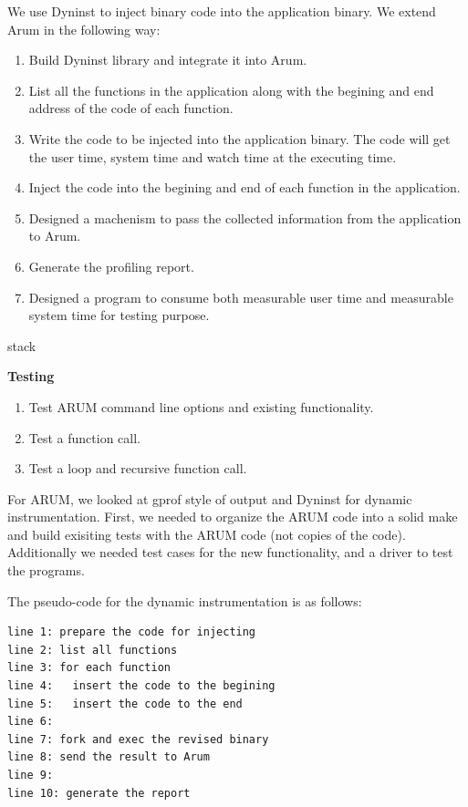 \documentclass[11pt,letterpaper,oneside]{article}
\begin{document}
We use Dyninst to inject binary code into the application binary. We extend Arum in the following way:
\begin{enumerate}
\item Build Dyninst library and integrate it into Arum.
\item List all the functions in the application along with the begining and end address of the code of each function.
\item Write the code to be injected into the application binary. The code will get the user time, system time and watch time at the executing time.
\item Inject the code into the begining and end of each function in the application.
\item Designed a machenism to pass the collected information from the application to Arum.
\item Generate the profiling report.
\item Designed a program to consume both measurable user time and measurable system time for testing purpose.
\end{enumerate}

stack

\textbf{Testing}
\begin{enumerate}
\item Test ARUM command line options and existing functionality.
\item Test a function call.
\item Test a loop and recursive function call.
\end{enumerate}

For ARUM, we looked at gprof style of output and Dyninst for dynamic instrumentation.  First, we needed to organize the ARUM code into a solid make and build exisiting tests with the ARUM code (not copies of the code).   Additionally we needed test cases for the new functionality, and a driver to test the programs.

The pseudo-code for the dynamic instrumentation is as follows:
\begin{Verbatim}[frame=single]
line 1: prepare the code for injecting
line 2: list all functions
line 3: for each function
line 4:   insert the code to the begining
line 5:   insert the code to the end
line 6:
line 7: fork and exec the revised binary
line 8: send the result to Arum
line 9: 
line 10: generate the report
\end{Verbatim}
\end{document}

